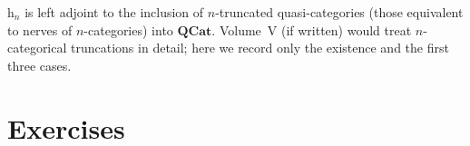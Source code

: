 \begin{remark}
$\mathrm{h}_n$ is left adjoint to the inclusion of $n$-truncated
quasi-categories (those equivalent to nerves of $n$-categories) into
$\mathbf{QCat}$. Volume~V (if written) would treat $n$-categorical
truncations in detail; here we record only the existence and the first
three cases.
\end{remark}


\section{Exercises}
\label{sec:mapping-equiv-exercises}

